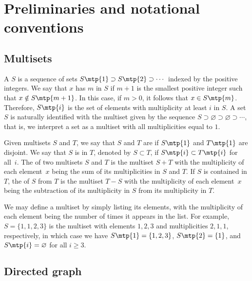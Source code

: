 \section{Preliminaries and notational conventions} \label{section:preliminaries}

\subsection{Multisets} \label{subsection:multisets}

A  \(S\) is a sequence of sets \(S\mtp{1} \supset S\mtp{2} \supset \cdots\) indexed by the positive integers.
We say that \(x\) has  \(m\) in \(S\) if \(m+1\) is the smallest positive integer such that \(x \notin S\mtp{m+1}\).
In this case, if \(m > 0\), it follows that \(x \in S\mtp{m}\).
Therefore, \(S\mtp{i}\) is the set of elements with multiplicity at least \(i\) in \(S\).
A set \(S\) is naturally identified with the multiset given by the sequence \(S \supset \varnothing \supset \varnothing \supset \cdots\), that is, we interpret a set as a multiset with all multiplicities equal to \(1\).

Given multisets \(S\) and \(T\), we say that \(S\) and \(T\) are  if \(S\mtp{1}\) and \(T\mtp{1}\) are disjoint.
We say that \(S\) is  in \(T\), denoted by \(S \subset T\), if \(S\mtp{i} \subset T\mtp{i}\) for all~\(i\).
The  of two multisets \(S\) and \(T\) is the multiset \(S + T\) with the multiplicity of each element~\(x\) being the sum of its multiplicities in \(S\) and \(T\).
If \(S\) is contained in \(T\), the  of \(S\) from \(T\) is the multiset \(T - S\) with the multiplicity of each element~\(x\) being the subtraction of its multiplicity in \(S\) from its multiplicity in \(T\).

We may define a multiset by simply listing its elements, with the multiplicity of each element being the number of times it appears in the list.
For example, \(S = \{1, 1, 2, 3\}\) is the multiset with elements \(1, 2, 3\) and multiplicities \(2, 1, 1\), respectively, in which case we have \(S\mtp{1} = \{1, 2, 3\}\), \(S\mtp{2} = \{1\}\), and \(S\mtp{i} = \varnothing\) for all \(i \geq 3\).

\subsection{Directed graph} \label{subsection:directedgraph}

